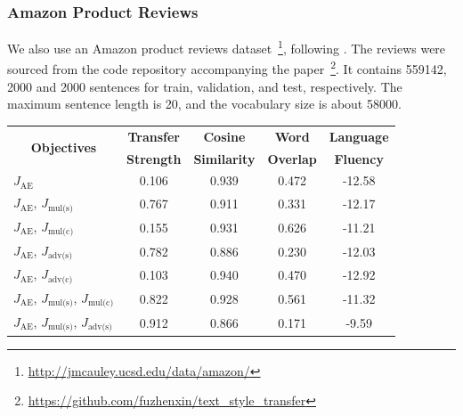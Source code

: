 \documentclass[letterpaper]{article} %
\newcommand{\tabh}[1]{\multicolumn{1}{c|}{\textbf{#1}}}
\newcommand{\tabc}[2]{\multicolumn{1}{|c||}{\multirow{#1}{*}{\textbf{#2}}}}
\newcommand{\loss}[1]{J_{\text{#1}}}
\newcommand{\citeay}[1]{\citeauthor{#1} \shortcite{#1}}
\begin{document}
\subsubsection{Amazon Product Reviews}

We also use an Amazon product reviews dataset~\footnote{\url{http://jmcauley.ucsd.edu/data/amazon/}}, following \citeay{fu2017style}.
The reviews were sourced from the code repository accompanying the paper~\footnote{\url{https://github.com/fuzhenxin/text_style_transfer}}.
It contains 559142, 2000 and 2000 sentences for train, validation, and test, respectively.
The maximum sentence length is 20, and the vocabulary size is about 58000.

\begin{table}[ht]
	\centering
	\begin{tabular}{| l || c | c | c | c |}
		\hline
		\tabc{2}{Objectives}                                                            & \tabh{Transfer} & \tabh{Cosine}     & \tabh{Word}    & \tabh{Language} \\
		                                                                                & \tabh{Strength} & \tabh{Similarity} & \tabh{Overlap} & \tabh{Fluency}  \\
		\hline
		\hline
		$\loss{AE}$                                                                     & 0.106           & 0.939             & 0.472          & -12.58          \\
		\hline
		$\loss{AE}$, $\loss{mul(s)}$                                                    & 0.767           & 0.911             & 0.331          & -12.17          \\
		\hline
		$\loss{AE}$, $\loss{mul(c)}$                                                    & 0.155           & 0.931             & 0.626          & -11.21          \\
		\hline
		$\loss{AE}$, $\loss{adv(s)}$                                                    & 0.782           & 0.886             & 0.230          & -12.03          \\
		\hline
		$\loss{AE}$, $\loss{adv(c)}$                                                    & 0.103           & 0.940             & 0.470          & -12.92          \\
		\hline
		$\loss{AE}$, $\loss{mul(s)}$, $\loss{mul(c)}$                                   & 0.822           & 0.928             & 0.561          & -11.32          \\
		\hline
		$\loss{AE}$, $\loss{mul(s)}$, $\loss{adv(s)}$                                   & 0.912           & 0.866             & 0.171          & -9.59           \\

\end{tabular}
\end{table}
\end{document}
